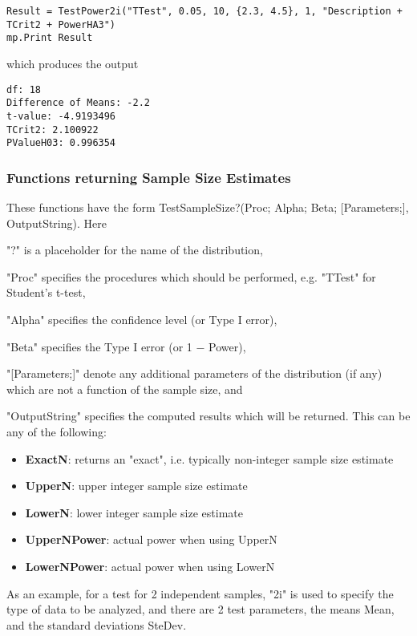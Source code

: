\begin{lstlisting}
Result = TestPower2i("TTest", 0.05, 10, {2.3, 4.5}, 1, "Description + TCrit2 + PowerHA3")
mp.Print Result
\end{lstlisting}
which produces the output

\begin{verbatim}
df: 18
Difference of Means: -2.2
t-value: -4.9193496
TCrit2: 2.100922
PValueH03: 0.996354
\end{verbatim}








\newpage
\subsubsection{Functions returning Sample Size Estimates}
These functions have the form \textsf{TestSampleSize?(Proc; Alpha; Beta; [Parameters;],  OutputString)}.
Here 

"?" is a placeholder for the name of the distribution, 

"Proc" specifies the procedures which should be performed, e.g. "TTest" for Student's t-test, 

"Alpha" specifies the confidence level (or Type I error), 

"Beta" specifies the Type I error (or 1 $-$ Power), 

"[Parameters;]" denote any additional parameters of the distribution (if any) which are not a function of the sample size, and 

"OutputString" specifies the computed results which will be returned. This can be any of the following:

\begin{itemize}
	\item \textbf{ExactN}: returns an "exact", i.e. typically non-integer sample size estimate 
	\item \textbf{UpperN}: upper integer sample size estimate
	\item \textbf{LowerN}: lower integer sample size estimate
	\item \textbf{UpperNPower}: actual power when using UpperN
	\item \textbf{LowerNPower}: actual power when using LowerN
\end{itemize}


\vspace{0.3cm}
As an example, for a test for 2 independent samples, "2i" is used to specify the type of data to be analyzed,  and there are 2 test parameters, the means  \textsf{Mean}, and the standard deviations \textsf{SteDev}.

